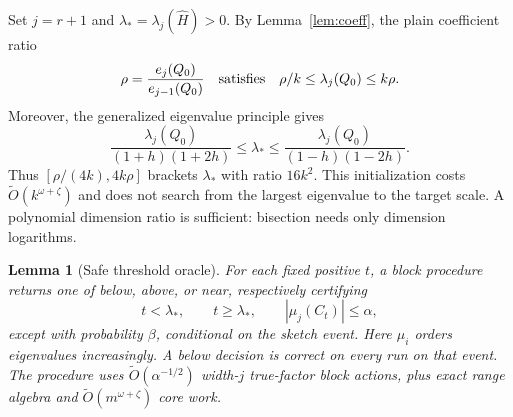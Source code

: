 \documentclass[11pt]{article}
\newtheorem{lemma}[theorem]{Lemma}
\newcommand{\tO}{\widetilde O}
\begin{document}
Set \(j=r+1\) and \(\lambda_*=\lambda_j(\widehat H)>0\).
By Lemma~\ref{lem:coeff}, the plain coefficient ratio
\[
 \rho=\frac{e_j(Q_0)}{e_{j-1}(Q_0)}
 \quad\hbox{satisfies}\quad
 \rho/k\leq\lambda_j(Q_0)\leq k\rho.
\]
Moreover, the generalized eigenvalue principle gives
\[
 \frac{\lambda_j(Q_0)}{(1+h)(1+2h)}
 \leq\lambda_*\leq
 \frac{\lambda_j(Q_0)}{(1-h)(1-2h)}.
\]
Thus \([\rho/(4k),4k\rho]\) brackets \(\lambda_*\) with ratio \(16k^2\).
This initialization costs \(\tO(k^{\omega+\zeta})\) and does not
search from the largest eigenvalue to the target scale. A polynomial
dimension ratio is sufficient: bisection needs only dimension logarithms.

\begin{lemma}[Safe threshold oracle]\label{lem:quantile}
For each fixed positive \(t\), a block procedure returns one of
\emph{below}, \emph{above}, or \emph{near}, respectively certifying
\begin{equation}\label{eq:quantile}
 t<\lambda_*,\qquad t\geq\lambda_*,\qquad |\mu_j(C_t)|\leq\alpha,
\end{equation}
except with probability \(\beta\), conditional on the sketch event.
Here \(\mu_i\) orders eigenvalues increasingly. A \emph{below} decision
is correct on every run on that event. The procedure
uses \(\tO(\alpha^{-1/2})\) width-\(j\) true-factor block actions,
plus exact range algebra and \(\tO(m^{\omega+\zeta})\) core work.
\end{lemma}
\end{document}
